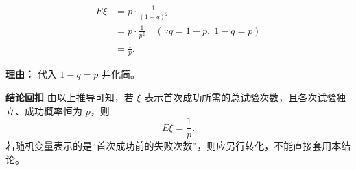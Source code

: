 \begin{proofbox}
\begin{description}[style=nextline, leftmargin=2.8em, labelsep=0.5em, itemsep=0.55em]
		\item[\textbf{步骤六（回代化简）：}]
		      \[
			      \begin{aligned}
				      E\xi
				       & =p\cdot\frac{1}{(1-q)^2}                          \\
				       & =p\cdot\frac{1}{p^2}\quad(\because q=1-p,\;1-q=p) \\
				       & =\frac{1}{p}.
			      \end{aligned}
		      \]
		      \par\textbf{理由：} 代入 $1-q=p$ 并化简。
	\end{description}

	\medskip

	\textbf{\textcolor{CProof}{结论回扣}}
	由以上推导可知，若 $\xi$ 表示首次成功所需的总试验次数，且各次试验独立、成功概率恒为 $p$，则
	\[
		E\xi=\frac{1}{p}.
	\]
	若随机变量表示的是“首次成功前的失败次数”，则应另行转化，不能直接套用本结论。
\end{proofbox}